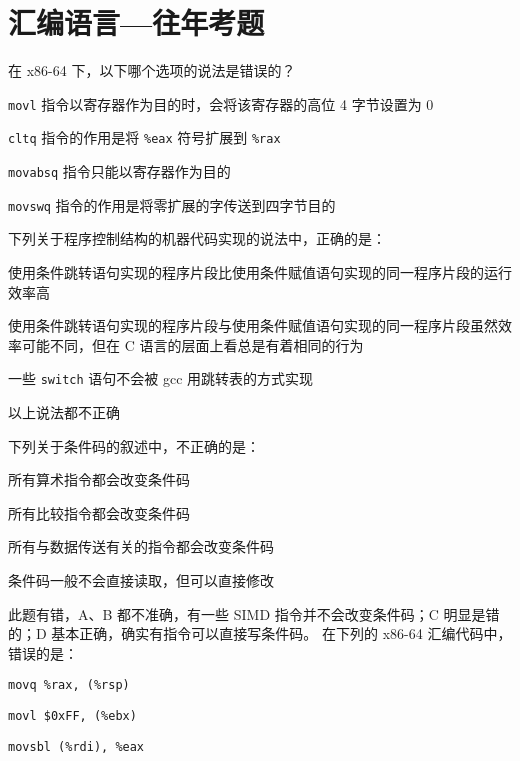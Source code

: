 \chapter{汇编语言{---}往年考题}
    \begin{problems}
         在 x86-64 下，以下哪个选项的说法是错误的？
        \begin{choices}
            \item \verb|movl| 指令以寄存器作为目的时，会将该寄存器的高位 4 字节设置为 0
            \item \verb|cltq| 指令的作用是将 \verb|%eax| 符号扩展到 \verb|%rax|
            \item \verb|movabsq| 指令只能以寄存器作为目的
            \item \verb|movswq| 指令的作用是将零扩展的字传送到四字节目的
        \end{choices}
         下列关于程序控制结构的机器代码实现的说法中，正确的是：
        \begin{choices}
            \item 使用条件跳转语句实现的程序片段比使用条件赋值语句实现的同一程序片段的运行效率高
            \item 使用条件跳转语句实现的程序片段与使用条件赋值语句实现的同一程序片段虽然效率可能不同，但在 C 语言的层面上看总是有着相同的行为
            \item 一些 \verb|switch| 语句不会被 gcc 用跳转表的方式实现
            \item 以上说法都不正确
        \end{choices}
         下列关于条件码的叙述中，不正确的是：
        \begin{choices}
            \item 所有算术指令都会改变条件码
            \item 所有比较指令都会改变条件码
            \item 所有与数据传送有关的指令都会改变条件码
            \item 条件码一般不会直接读取，但可以直接修改
        \end{choices}
        \sol 此题有错，A、B 都不准确，有一些 SIMD 指令并不会改变条件码；C 明显是错的；D 基本正确，确实有指令可以直接写条件码。
         在下列的 x86-64 汇编代码中，错误的是：
        \begin{choices}
            \item \verb|movq %rax, (%rsp)|
            \item \verb|movl $0xFF, (%ebx)|
            \item \verb|movsbl (%rdi), %eax|

\end{choices}
\end{problems}
